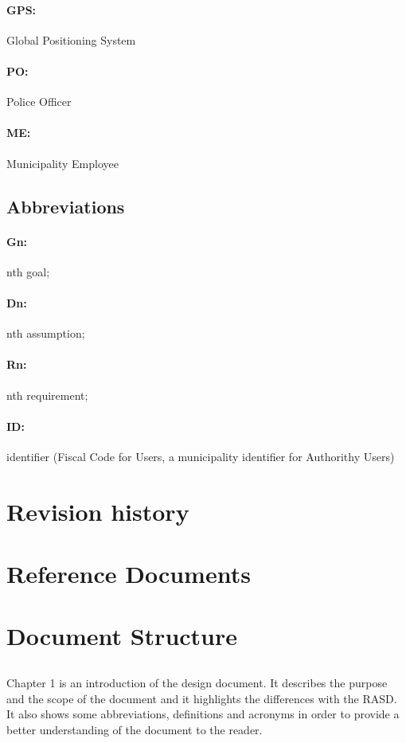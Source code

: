         \paragraph{GPS:} Global Positioning System \paragraph{PO:} Police
        Officer \paragraph{ME:} Municipality Employee
        \subsection{Abbreviations}
        \paragraph{Gn:} nth goal; \paragraph{Dn:} nth assumption;
        \paragraph{Rn:} nth requirement; \paragraph{ID: } identifier (Fiscal
        Code for Users, a municipality identifier for Authorithy Users)
        
    \section{Revision history}
    \section{Reference Documents}
    \newpage
    \section{Document Structure}
        \subsection*{}
        Chapter 1 is an introduction of the design document. It describes the
        purpose and the scope of the document and it highlights the differences
        with the RASD. \\It also shows some abbreviations, definitions and
        acronyms in order to provide a better understanding of the document to
        the reader.

